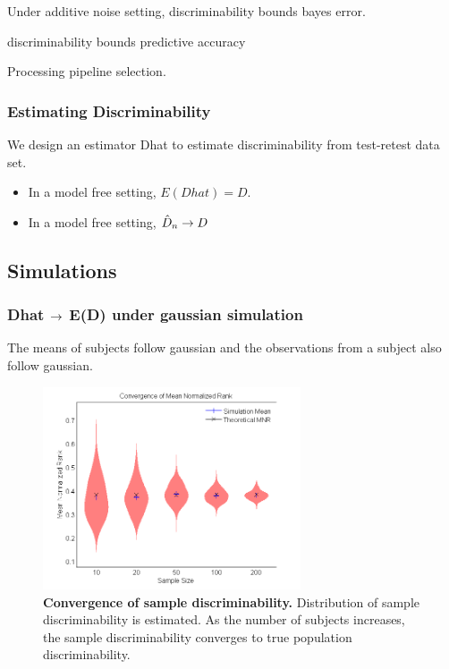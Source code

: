\documentclass{article}
\begin{document}
 Under additive noise setting, discriminability bounds bayes error.

\begin{thm}
discriminability bounds predictive accuracy
\end{thm}

 Processing pipeline selection.

\subsubsection{Estimating Discriminability}

 We design an estimator Dhat to estimate discriminability from test-retest data set.

\begin{itemize}

\item In a model free setting, $E(Dhat)=D$.

\item In a model free setting, $\hat{D}_n \rightarrow D$
\end{itemize}


\subsection{Simulations}


\subsubsection{Dhat $\rightarrow$ E(D) under gaussian simulation}
 The means of subjects follow gaussian and the observations from a subject also follow gaussian. 

\begin{figure}[ht!]
	\includegraphics[width=3.0in]{../Figs/simumnr_violin.png}
	\caption{{\bf Convergence of sample discriminability.} Distribution of sample discriminability is estimated. As the number of subjects increases, the sample discriminability converges to true population discriminability. }
	\label{fig:1}
\end{figure}
\end{document}
